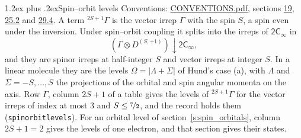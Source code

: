 \documentclass[10pt,a4paper]{article}
\makeatletter
\renewcommand\section{\@startsection{section}{1}{\z@}{-3ex plus -1ex minus -.2ex}%
  {1.2ex plus .2ex}{\normalfont\large\sffamily\bfseries\color{parttitle}}}
\numberwithin{equation}{section}
\newcommand{\grp}[1]{\mathsf{#1}}
\newcommand{\restr}[2]{#1\!\downarrow#2}
\newcommand{\irrJp}[2]{D^{(#1,#2)}}
\newcommand{\irrprod}{\otimes}
\newcommand{\term}[2]{{}^{#1}#2}
\makeatother
\begin{document}
\section{Spin--orbit levels}\label{s:spin_orbit}
Conventions: \href{../../CONVENTIONS.pdf}{CONVENTIONS.pdf}, sections \href{../../../rotation/CONVENTIONS.pdf\#conv.19}{19}, \href{../../CONVENTIONS.pdf\#conv.25.2}{25.2} and \href{../../CONVENTIONS.pdf\#conv.29.4}{29.4}.
\leavevmode\label{n:local.spin}\label{n:symbol.term}A term $\term{2S+1}{\Gamma}$ is the vector irrep $\Gamma$ with the spin $S$, a spin even under the inversion. Under spin--orbit coupling it splits into the irreps of $\grp{2C_{\infty }}$ in
\begin{equation}\label{e:spinorbit}\restr{(\Gamma \irrprod \irrJp{S}{+1})}{\grp{2C_{\infty }}},\end{equation}
and they are spinor irreps at half-integer $S$ and vector irreps at integer $S$. In a linear molecule they are the levels $\Omega = \lvert\Lambda + \Sigma\rvert$ of Hund's case (a), with $\Lambda$ and $\Sigma = -S, \dots, S$ the projections of the orbital and spin angular momenta on the axis. Row $\Gamma$, column $2S + 1$ of a table gives the levels of $\term{2S+1}{\Gamma}$ for the vector irreps of index at most 3 and $S \le \nicefrac{7}{2}$, and the record holds them (\texttt{spinorbitlevels}). For an orbital level of section~\ref{s:spin_orbitals}, column $2S + 1 = 2$ gives the levels of one electron, and that section gives their states.
\end{document}
